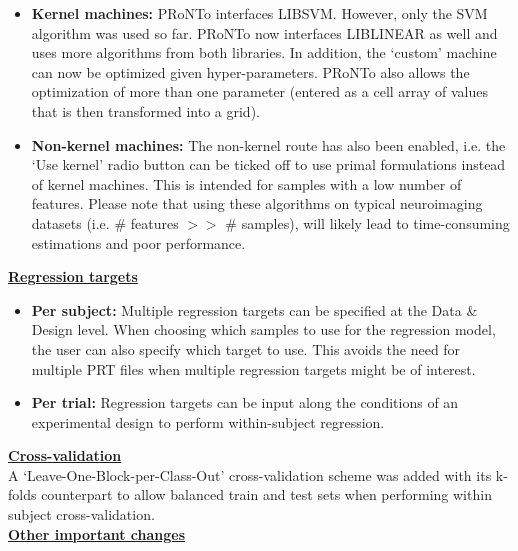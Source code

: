 \begin{itemize}

\item \textbf{Kernel machines:} PRoNTo interfaces LIBSVM. However, only the SVM algorithm was used so far. PRoNTo now interfaces LIBLINEAR as well and uses more algorithms from both libraries. In addition, the `custom' machine can now be optimized given hyper-parameters. PRoNTo also allows the optimization of more than one parameter (entered as a cell array of values that is then transformed into a grid).

\item \textbf{Non-kernel machines:} The non-kernel route has also been enabled, i.e. the `Use kernel' radio button can be ticked off to use primal formulations instead of kernel machines. This is intended for samples with a low number of features. Please note that using these algorithms on typical neuroimaging datasets (i.e. \# features $>>$ \# samples), will likely lead to time-consuming estimations and poor performance.

\end{itemize}

\noindent \underline{\textbf{Regression targets}}

\begin{itemize}

\item \textbf{Per subject:} Multiple regression targets can be specified at the Data \& Design level. When choosing which samples to use for the regression model, the user can also specify which target to use. This avoids the need for multiple PRT files when multiple regression targets might be of interest.

\item \textbf{Per trial:} Regression targets can be input along the conditions of an experimental design to perform within-subject regression.

\end{itemize} 

\noindent \underline{\textbf{Cross-validation}}
\\

A `Leave-One-Block-per-Class-Out' cross-validation scheme was added with its k-folds counterpart to allow balanced train and test sets when performing within subject cross-validation.
\\

\noindent \underline{\textbf{Other important changes}}
\\


